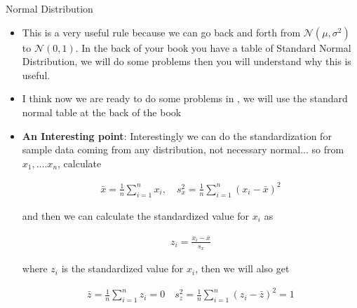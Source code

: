 \documentclass[8pt, usepdftitle = false]{beamer}
\begin{document}
\begin{frame}[allowframebreaks]{Normal Distribution}
\begin{itemize}
\item This is a very useful rule because we can go back and forth from $\mathcal{N}(\mu, \sigma^2)$ to $\mathcal{N}(0, 1)$. In the back of your book you have a table of Standard Normal Distribution, we will do some problems then you will understand why this is useful. 




\item I think now we are ready to do some problems in \cite{anderson_statistics_2020}, we will use the standard normal table at the back of the book 




\framebreak



\item \textbf{An Interesting point}: Interestingly we can do the standardization for sample data coming from any distribution, not necessary normal... so from $x_1, \ldots. x_n$,  calculate

\begin{align*}
\bar{x} = \frac{1}{n} \sum_{i=1}^{n} x_i, \quad s^2_x = \frac{1}{n} \sum_{i=1}^{n} (x_i - \bar{x})^2
\end{align*}

and then we can calculate the standardized value for $x_i$ as

\begin{align*}
z_i = \frac{x_i - \bar{x}}{s_x}
\end{align*}

where $z_i$ is the standardized value for $x_i$, then we will also get 

\begin{align*}
\bar{z} = \frac{1}{n} \sum_{i=1}^{n} z_i = 0 \quad s^2_z = \frac{1}{n} \sum_{i=1}^{n} (z_i - \bar{z})^2 = 1
\end{align*}



\end{itemize}


\end{frame}







\end{document}
